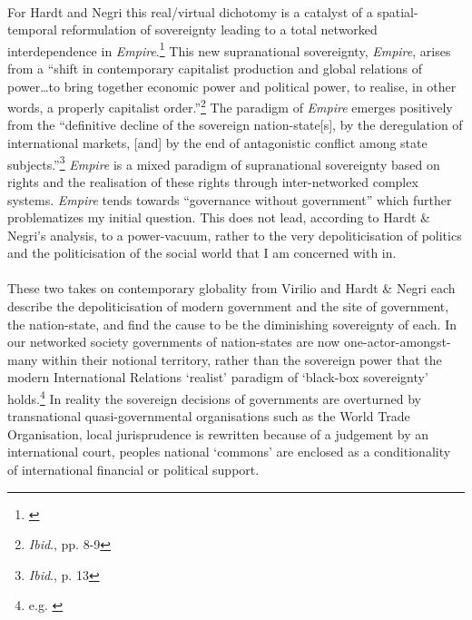 \paragraph{}For Hardt and Negri this real/virtual dichotomy is a catalyst of a spatial-temporal reformulation of sovereignty leading to a total networked interdependence in \textit{Empire}.\footnote{\cite{Hardt:2001jl}} This new supranational sovereignty, \textit{Empire}, arises from a ``shift in contemporary capitalist production and global relations of power\ldots to bring together economic power and political power, to realise, in other words, a properly capitalist order.''\footnote{\textit{Ibid}., pp. 8-9} The paradigm of \textit{Empire} emerges positively from the ``definitive decline of the sovereign nation-state[s], by the deregulation of international markets, [and] by the end of antagonistic conflict among state subjects.''\footnote{\textit{Ibid}., p. 13} \textit{Empire} is a mixed paradigm of supranational sovereignty based on rights and the realisation of these rights through inter-networked complex systems. \textit{Empire} tends towards ``governance without government'' which further problematizes my initial question. This does not lead, according to Hardt \& Negri's analysis, to a power-vacuum, rather to the very depoliticisation of politics and the politicisation of the social world that I am concerned with in.

\paragraph{}These two takes on contemporary globality from Virilio and Hardt \& Negri each describe the depoliticisation of modern government and the site of government, the nation-state, and find the cause to be the diminishing sovereignty of each. In our networked society governments of nation-states are now one-actor-amongst-many within their notional territory, rather than the sovereign power that the modern International Relations `realist' paradigm of `black-box sovereignty' holds.\footnote{e.g. \cite{Waltz:1979}} In reality the sovereign decisions of governments are overturned by transnational quasi-governmental organisations such as the World Trade Organisation, local jurisprudence is rewritten because of a judgement by an international court, peoples national `commons' are enclosed as a conditionality of international financial or political support.

